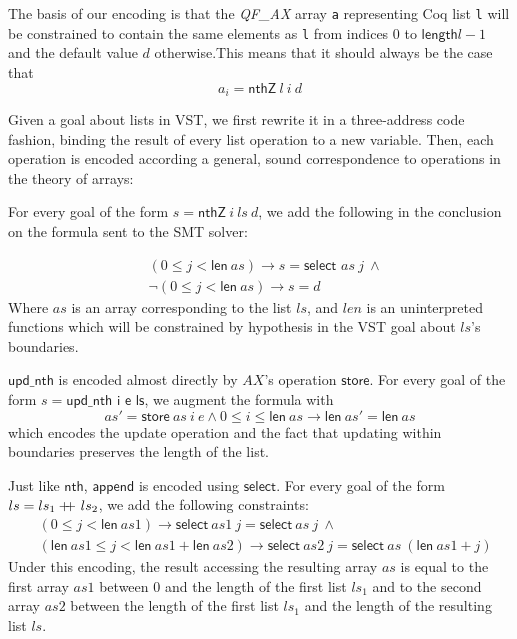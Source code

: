 \documentclass[onecolumn, preprint]{sigplanconf}
\newcommand\doubleplus{+\kern-1.3ex+\kern0.8ex}
\begin{document}
The basis of our encoding is that the \emph{QF\_AX} array \texttt{a} representing Coq list \texttt{l} will be constrained to contain the same elements as \texttt{l} from indices $0$ to $\mathsf{length} l - 1$ and the default value $d$ otherwise.This means that it should always be the case that
$$ a_i = \textsf{nthZ}\ l\ i\ d$$

Given a goal about lists in VST, we first rewrite it in a three-address code fashion, binding the result of every list operation to a new variable. Then, each operation is encoded according a general, sound correspondence to operations in the theory of arrays:

For every goal of the form $s = \textsf{nthZ}\ i\ ls\ d$, we add the following in the conclusion on the formula sent to the SMT solver:

\begin{align*}
&(0 \leq j < \textsf{len}\ as) \to s = \textsf{select } as\ j\ \wedge \\
&\neg (0 \leq j < \textsf{len}\ as) \to s = d 
\end{align*}
Where $as$ is an array corresponding to the list $ls$, and $len$ is an uninterpreted functions which will be constrained by hypothesis in the VST goal about $ls$'s boundaries.


$\textsf{upd\_nth}$ is encoded almost directly by $AX$'s operation $\textsf{store}$. For every goal of the form $s = \textsf{upd\_nth\ i\ e\ ls}$, we augment the formula with
$$ as' = \textsf{store}\ as\ i\ e \wedge 0 \leq i \leq \textsf{len}\ as \to \textsf{len}\ as' = \textsf{len}\ as$$
which encodes the update operation and the fact that updating within boundaries preserves the length of the list.


Just like $\textsf{nth}$, $\textsf{append}$ is encoded using $\textsf{select}$. For every goal of the form $ls = ls_1 \doubleplus ls_2$, we add the following constraints:
\begin{align*}
&(0 \leq j < \textsf{len}\ as1) \to \textsf{select}\ as1\ j = \textsf{select}\ as\ j\ \wedge \\
&(\textsf{len}\ as1 \leq j < \textsf{len}\ as1 + \textsf{len}\ as2) \to \textsf{select}\ as2\ j = \textsf{select}\ as\ (\textsf{len}\ as1 + j)
  \end{align*}
Under this encoding, the result accessing the resulting array $as$ is equal to the first array $as1$ between $0$ and the length of the first list $ls_1$ and to the second array $as2$ between the length of the first list $ls_1$ and the length of the resulting list $ls$.
\end{document}

